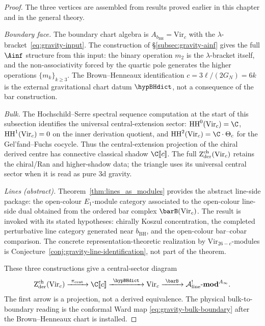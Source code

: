 \begin{proof}
The three vertices are assembled from results proved earlier in
this chapter and in the general theory.

\emph{Boundary face.}
The boundary chart algebra is \(A_{b_{\mathrm{BH}}}=\mathrm{Vir}_c\)
with the
$\lambda$-bracket~\eqref{eq:gravity-input}. The construction of
\S\ref{subsec:gravity-ainf} gives the full $\Ainf$
structure from this input: the binary operation $m_2$ is the
$\lambda$-bracket itself, and the non-associativity forced by the
quartic pole generates the higher operations $\{m_k\}_{k \ge 3}$.
The Brown--Henneaux identification \(c = 3\ell/(2G_N)=6k\) is the
external gravitational chart datum \(\hypBHdict\), not a consequence
of the bar construction.

\emph{Bulk.}
The Hochschild--Serre spectral sequence computation at the start of
this subsection identifies the universal central-extension sector:
$\HH^0(\mathrm{Vir}_c)=\C$, $\operatorname{HH}^1(\mathrm{Vir}_c)=0$ on the inner
derivation quotient, and $\HH^2(\mathrm{Vir}_c)=\C\cdot\Theta_c$ for
the Gel'fand--Fuchs cocycle. Thus the central-extension projection of
the chiral derived centre has connective classical shadow
\(\C[\![c]\!]\). The full
$\operatorname{Z}_{\mathrm{der}}^{\mathrm{ch}}(\mathrm{Vir}_c)$ retains the chiral/Ran and
higher-shadow data; the triangle uses its universal central sector
when it is read as pure 3d gravity.

\emph{Lines (abstract).}
Theorem~\ref{thm:lines_as_modules} provides the abstract line-side
package: the open-colour $E_1$-module category associated to the
open-colour line-side dual obtained from the ordered bar complex
\(\barB(\mathrm{Vir}_c)\).
The result is invoked with its stated hypotheses: chirally Koszul
concentration, the completed perturbative line category generated near
\(b_{\mathrm{BH}}\), and the open-colour bar--cobar comparison.  The
concrete representation-theoretic realization by
\(\mathrm{Vir}_{26-c}\)-modules is Conjecture~\ref{conj:gravity-line-identification},
not part of the theorem.

These three constructions give a central-sector diagram
\[
\Zder^{\mathrm{ch}}(\mathrm{Vir}_c)
\xrightarrow{\ \pi_{\mathrm{cent}}\ }
\C[\![c]\!]
\xrightarrow{\ \hypBHdict\ }
\mathrm{Vir}_c
\xrightarrow{\ \barB\ }
\mathcal A^{!}_{\mathrm{line}}\text{-}\mathbf{mod}^{A_\infty}.
\]
The first arrow is a projection, not a derived equivalence.  The
physical bulk-to-boundary reading is the conformal Ward map
\eqref{eq:gravity-bulk-boundary} after the Brown--Henneaux chart is
installed.
\end{proof}

